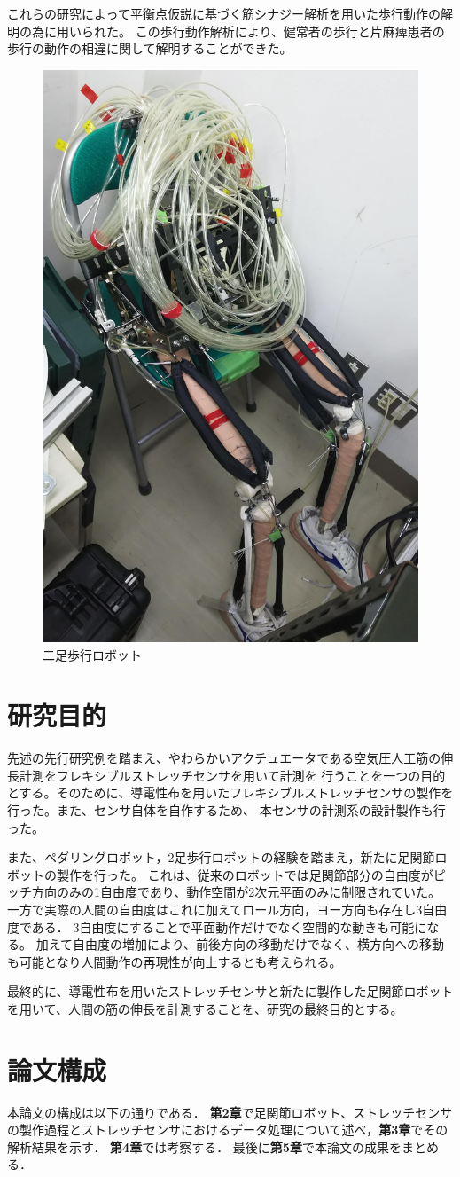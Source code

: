 これらの研究によって平衡点仮説に基づく筋シナジー解析を用いた歩行動作の解明の為に用いられた。
この歩行動作解析により、健常者の歩行と片麻痺患者の歩行の動作の相違に関して解明することができた。
\begin{figure}[h]
  \begin{center}
  \includegraphics[width=0.35\columnwidth,clip]{./1_prolusion/2nd.eps}
  \caption{二足歩行ロボット}
  \label{2号機}
 \end{center}
\end{figure}

\newpage

\section{研究目的}
先述の先行研究例を踏まえ、やわらかいアクチュエータである空気圧人工筋の伸長計測をフレキシブルストレッチセンサを用いて計測を
行うことを一つの目的とする。そのために、導電性布を用いたフレキシブルストレッチセンサの製作を行った。また、センサ自体を自作するため、
本センサの計測系の設計製作も行った。

また、ペダリングロボット，2足歩行ロボットの経験を踏まえ，新たに足関節ロボットの製作を行った。
これは、従来のロボットでは足関節部分の自由度がピッチ方向のみの1自由度であり、動作空間が2次元平面のみに制限されていた。
一方で実際の人間の自由度はこれに加えてロール方向，ヨー方向も存在し3自由度である．
3自由度にすることで平面動作だけでなく空間的な動きも可能になる。
加えて自由度の増加により、前後方向の移動だけでなく、横方向への移動も可能となり人間動作の再現性が向上するとも考えられる。

最終的に、導電性布を用いたストレッチセンサと新たに製作した足関節ロボットを用いて、人間の筋の伸長を計測することを、研究の最終目的とする。

\section{論文構成}
本論文の構成は以下の通りである．
{\bf 第2章}で足関節ロボット、ストレッチセンサの製作過程とストレッチセンサにおけるデータ処理について述べ，{\bf 第3章}でその解析結果を示す．
{\bf 第4章}では考察する． %
最後に{\bf 第5章}で本論文の成果をまとめる．
